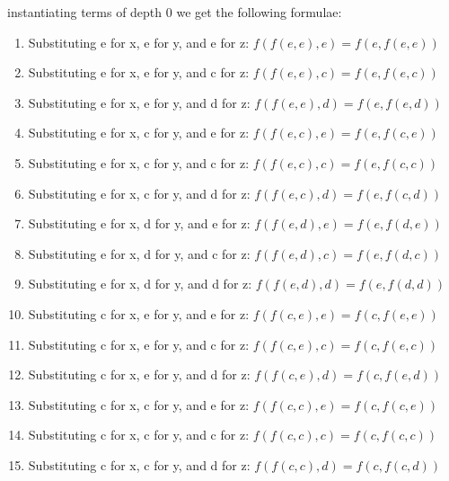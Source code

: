 \documentclass[12pt]{article}
\begin{document}
instantiating terms of depth 0 we get the following formulae:

\begin{enumerate}
    \item Substituting e for x, e for y, and e for z:
    $f(f(e,e),e) = f(e,f(e,e))$
    
    \item Substituting e for x, e for y, and c for z:
    $f(f(e,e),c) = f(e,f(e,c))$
    
    \item Substituting e for x, e for y, and d for z:
    $f(f(e,e),d) = f(e,f(e,d))$
    
    \item Substituting e for x, c for y, and e for z:
    $f(f(e,c),e) = f(e,f(c,e))$
    
    \item Substituting e for x, c for y, and c for z:
    $f(f(e,c),c) = f(e,f(c,c))$
    
    \item Substituting e for x, c for y, and d for z:
    $f(f(e,c),d) = f(e,f(c,d))$
    
    \item Substituting e for x, d for y, and e for z:
    $f(f(e,d),e) = f(e,f(d,e))$
    
    \item Substituting e for x, d for y, and c for z:
    $f(f(e,d),c) = f(e,f(d,c))$
    
    \item Substituting e for x, d for y, and d for z:
    $f(f(e,d),d) = f(e,f(d,d))$
    
    \item Substituting c for x, e for y, and e for z:
    $f(f(c,e),e) = f(c,f(e,e))$
    
    \item Substituting c for x, e for y, and c for z:
    $f(f(c,e),c) = f(c,f(e,c))$
    
    \item Substituting c for x, e for y, and d for z:
    $f(f(c,e),d) = f(c,f(e,d))$
    
    \item Substituting c for x, c for y, and e for z:
    $f(f(c,c),e) = f(c,f(c,e))$
    
    \item Substituting c for x, c for y, and c for z:
    $f(f(c,c),c) = f(c,f(c,c))$
    
    \item Substituting c for x, c for y, and d for z:
    $f(f(c,c),d) = f(c,f(c,d))$
    

\end{enumerate}
\end{document}
